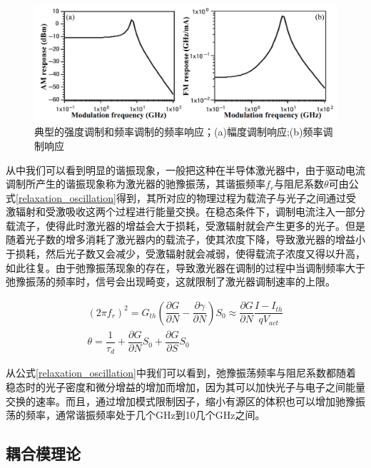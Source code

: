 \begin{figure}[htb]
	\centering
	\includegraphics[width=16cm]{./Pictures/laser_amfm_response.jpg}
	\captionsetup{justification=centering}
	\caption{典型的强度调制和频率调制的频率响应；(a)幅度调制响应;(b)频率调制响应\cite{morthier2013handbook}}
	\label{laser_amfm_response}
\end{figure}

从中我们可以看到明显的谐振现象，一般把这种在半导体激光器中，由于驱动电流调制所产生的谐振现象称为激光器的驰豫振荡，其谐振频率$f_{r}$与阻尼系数$\theta$可由公式\ref{relaxation_oscillation}得到，其所对应的物理过程为载流子与光子之间通过受激辐射和受激吸收这两个过程进行能量交换。在稳态条件下，调制电流注入一部分载流子，使得此时激光器的增益会大于损耗，受激辐射就会产生更多的光子。但是随着光子数的增多消耗了激光器内的载流子，使其浓度下降，导致激光器的增益小于损耗，然后光子数又会减少，受激辐射就会减弱，使得载流子浓度又得以升高，如此往复。由于弛豫振荡现象的存在，导致激光器在调制的过程中当调制频率大于弛豫振荡的频率时，信号会出现畸变，这就限制了激光器调制速率的上限。

\begin{equation}
\label{relaxation_oscillation}
\begin{array}{l}
(2\pi f_{r})^{2} = G_{th}(\dfrac{\partial G}{\partial N}-\dfrac{\partial\gamma}{\partial N})S_{0} \approx \dfrac{\partial G}{\partial N}\dfrac{I-I_{th}}{qV_{act}}\\
\theta = \dfrac{1}{\tau_{d}} + \dfrac{\partial G}{\partial N}S_{0}+\dfrac{\partial G}{\partial S}S_{0}
\end{array}
\end{equation}

从公式\ref{relaxation_oscillation}中我们可以看到，弛豫振荡频率与阻尼系数都随着稳态时的光子密度和微分增益的增加而增加，因为其可以加快光子与电子之间能量交换的速率。而且，通过增加模式限制因子，缩小有源区的体积也可以增加驰豫振荡的频率，通常谐振频率处于几个GHz到10几个GHz之间。

\subsection{耦合模理论}

